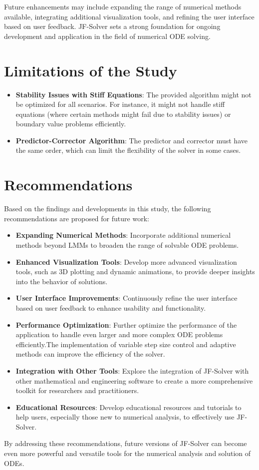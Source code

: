 Future enhancements may include expanding the range of numerical methods available, integrating additional visualization tools, and refining the user interface based on user feedback. JF-Solver sets a strong foundation for ongoing development and application in the field of numerical ODE solving.


\section{Limitations of the Study}
\begin{itemize}
  \item \textbf{Stability Issues with Stiff Equations}: The provided algorithm might not be optimized for all scenarios. For instance, it might not handle stiff equations (where certain methods might fail due to stability issues) or boundary value problems efficiently.
  \item \textbf{Predictor-Corrector Algorithm}: The predictor and corrector must have the same order, which can limit the flexibility of the solver in some cases.
\end{itemize}



\section{Recommendations}

Based on the findings and developments in this study, the following recommendations are proposed for future work:

\begin{itemize}
  \item \textbf{Expanding Numerical Methods}: Incorporate additional numerical methods beyond LMMs to broaden the range of solvable ODE problems.
  \item \textbf{Enhanced Visualization Tools}: Develop more advanced visualization tools, such as 3D plotting and dynamic animations, to provide deeper insights into the behavior of solutions.
  \item \textbf{User Interface Improvements}: Continuously refine the user interface based on user feedback to enhance usability and functionality.
  
  \item \textbf{Performance Optimization}: Further optimize the performance of the application to handle even larger and more complex ODE problems efficiently.The implementation of variable step size control and adaptive methods can improve the efficiency of the solver.
  \item \textbf{Integration with Other Tools}: Explore the integration of JF-Solver with other mathematical and engineering software to create a more comprehensive toolkit for researchers and practitioners.
  \item \textbf{Educational Resources}: Develop educational resources and tutorials to help users, especially those new to numerical analysis, to effectively use JF-Solver.
\end{itemize}

By addressing these recommendations, future versions of JF-Solver can become even more powerful and versatile tools for the numerical analysis and solution of ODEs.
